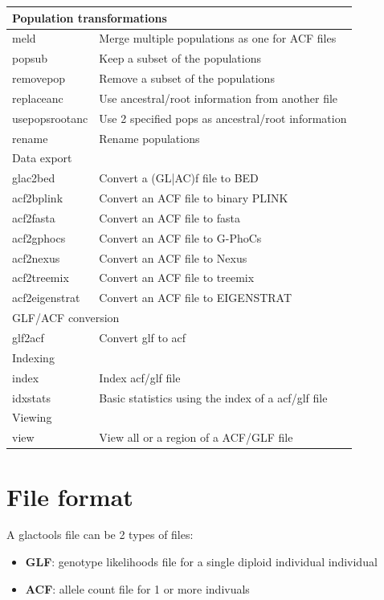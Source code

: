 \documentclass[a4paper]{article}
\begin{document}
\begin{tabular}{|l|l|}
\hline
\multicolumn{2}{|l|}{Population transformations} \\
\hline
      meld        &    Merge multiple populations as one for ACF files \\
      popsub      &    Keep a subset of the populations \\
      removepop   &    Remove a subset of the populations \\
      replaceanc  &    Use ancestral/root information from another file \\
      usepopsrootanc &  Use 2 specified pops as ancestral/root information \\
      rename      &    Rename populations \\
\hline
\multicolumn{2}{|l|}{Data export} \\
\hline
      glac2bed    &    Convert a (GL|AC)f file to BED \\
      acf2bplink  &    Convert an ACF file to binary PLINK \\
      acf2fasta   &    Convert an ACF file to fasta \\
      acf2gphocs  &    Convert an ACF file to G-PhoCs \\
      acf2nexus   &    Convert an ACF file to Nexus \\
      acf2treemix &    Convert an ACF file to treemix \\
      acf2eigenstrat &  Convert an ACF file to EIGENSTRAT \\
\hline
\multicolumn{2}{|l|}{GLF/ACF conversion} \\
\hline
      glf2acf     &    Convert glf to acf  \\
\hline
\multicolumn{2}{|l|}{Indexing} \\
\hline
      index       &    Index acf/glf file \\
      idxstats    &    Basic statistics using the index of a acf/glf file \\
\hline
\multicolumn{2}{|l|}{Viewing}\\ 
\hline
      view        &    View all or a region of a ACF/GLF file  \\
\hline
\end{tabular}

\section{File format}


\noindent  A glactools file can be 2 types of files:
\begin{itemize}
\item {\bf GLF}: genotype likelihoods file for a single diploid individual individual
\item {\bf ACF}: allele count file for 1 or more indivuals
\end{itemize}
\end{document}
